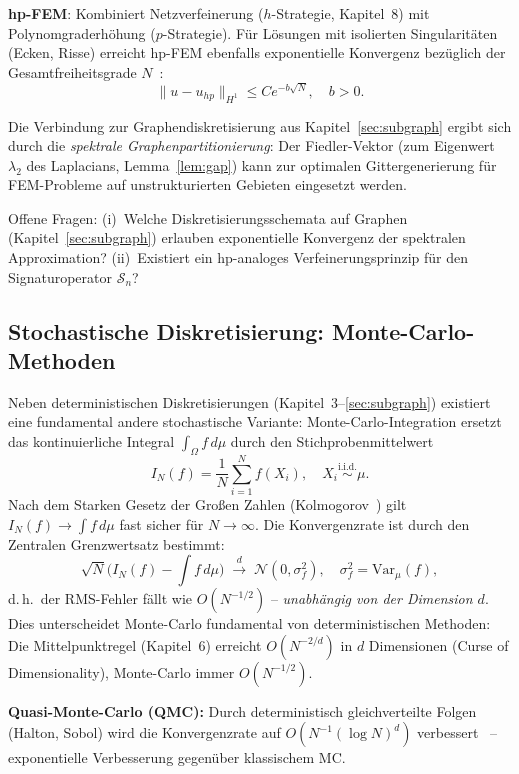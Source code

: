﻿\documentclass[a4paper,12pt]{article}
\theoremstyle{definition}
\begin{document}
\textbf{hp-FEM}: Kombiniert Netzverfeinerung ($h$-Strategie, Kapitel~8) mit
Polynomgraderhöhung ($p$-Strategie). Für Lösungen mit isolierten Singularitäten
(Ecken, Risse) erreicht hp-FEM ebenfalls exponentielle Konvergenz bezüglich der
Gesamtfreiheitsgrade $N$~\cite{schwab2004}:
\[
\|u - u_{hp}\|_{H^1} \leq C e^{-b\sqrt{N}}, \quad b > 0.
\]

Die Verbindung zur Graphendiskretisierung aus Kapitel~\ref{sec:subgraph} ergibt sich
durch die \emph{spektrale Graphenpartitionierung}: Der Fiedler-Vektor (zum Eigenwert
$\lambda_2$ des Laplacians, Lemma~\ref{lem:gap}) kann zur optimalen Gittergenerierung
für FEM-Probleme auf unstrukturierten Gebieten eingesetzt werden.

Offene Fragen: (i)~Welche Diskretisierungsschemata auf Graphen (Kapitel~\ref{sec:subgraph})
erlauben exponentielle Konvergenz der spektralen Approximation? (ii)~Existiert ein
hp-analoges Verfeinerungsprinzip für den Signaturoperator $\mathcal{S}_n$?

\subsection{Stochastische Diskretisierung: Monte-Carlo-Methoden}

Neben deterministischen Diskretisierungen (Kapitel~3--\ref{sec:subgraph}) existiert eine
fundamental andere stochastische Variante: Monte-Carlo-Integration ersetzt das
kontinuierliche Integral $\int_\Omega f\,d\mu$ durch den Stichprobenmittelwert
\[
I_N(f) = \frac{1}{N}\sum_{i=1}^N f(X_i), \quad X_i \overset{\text{i.i.d.}}{\sim} \mu.
\]
Nach dem Starken Gesetz der Großen Zahlen (Kolmogorov~\cite{kolmogorov1933}) gilt
$I_N(f) \to \int f\,d\mu$ fast sicher für $N \to \infty$. Die Konvergenzrate ist durch
den Zentralen Grenzwertsatz bestimmt:
\[
\sqrt{N}\bigl(I_N(f) - \int f\,d\mu\bigr) \;\xrightarrow{d}\; \mathcal{N}(0, \sigma_f^2),
\quad \sigma_f^2 = \mathrm{Var}_\mu(f),
\]
d.\,h.\ der RMS-Fehler fällt wie $O(N^{-1/2})$ -- \emph{unabhängig von der Dimension $d$}.
Dies unterscheidet Monte-Carlo fundamental von deterministischen Methoden: Die
Mittelpunktregel (Kapitel~6) erreicht $O(N^{-2/d})$ in $d$ Dimensionen (Curse of
Dimensionality), Monte-Carlo immer $O(N^{-1/2})$.

\textbf{Quasi-Monte-Carlo (QMC):} Durch deterministisch gleichverteilte Folgen
(Halton, Sobol) wird die Konvergenzrate auf $O(N^{-1}(\log N)^d)$
verbessert~\cite{niederreiter1992} -- exponentielle Verbesserung gegenüber klassischem MC.
\end{document}
